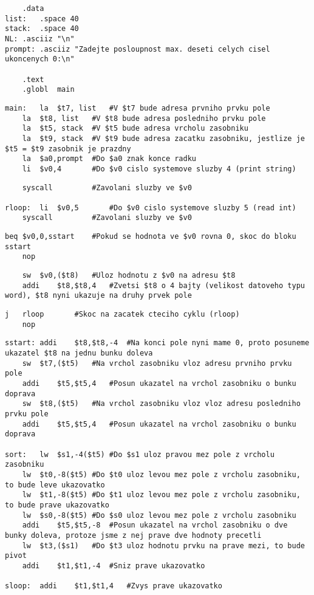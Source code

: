 \documentclass[11pt, titlepage]{article}
\begin{document}
\begin{lstlisting}
	.data
list:	.space 40
stack:	.space 40
NL:	.asciiz "\n"
prompt:	.asciiz "Zadejte posloupnost max. deseti celych cisel ukoncenych 0:\n"

	.text
	.globl	main
\end{lstlisting}
\begin{lstlisting}[backgroundcolor=\color{Green}] 
main:	la	$t7, list	#V $t7 bude adresa prvniho prvku pole
	la	$t8, list	#V $t8 bude adresa posledniho prvku pole 
	la	$t5, stack	#V $t5 bude adresa vrcholu zasobniku
	la	$t9, stack	#V $t9 bude adresa zacatku zasobniku, jestlize je $t5 = $t9 zasobnik je prazdny
	la	$a0,prompt	#Do $a0 znak konce radku
	li	$v0,4		#Do $v0 cislo systemove sluzby 4 (print string)
\end{lstlisting}
\begin{lstlisting}
	syscall			#Zavolani sluzby ve $v0

rloop:	li	$v0,5		#Do $v0 cislo systemove sluzby 5 (read int)
	syscall			#Zavolani sluzby ve $v0
\end{lstlisting}
\begin{lstlisting}[backgroundcolor=\color{Red}]   
	beq	$v0,0,sstart	#Pokud se hodnota ve $v0 rovna 0, skoc do bloku sstart
	nop
\end{lstlisting}
\begin{lstlisting}
	sw	$v0,($t8)	#Uloz hodnotu z $v0 na adresu $t8
	addi	$t8,$t8,4	#Zvetsi $t8 o 4 bajty (velikost datoveho typu word), $t8 nyni ukazuje na druhy prvek pole
\end{lstlisting}
\begin{lstlisting}[backgroundcolor=\color{Red}]   
	j	rloop		#Skoc na zacatek cteciho cyklu (rloop)
	nop
\end{lstlisting}
\begin{lstlisting}
sstart:	addi	$t8,$t8,-4	#Na konci pole nyni mame 0, proto posuneme ukazatel $t8 na jednu bunku doleva
	sw	$t7,($t5)	#Na vrchol zasobniku vloz adresu prvniho prvku pole
	addi	$t5,$t5,4	#Posun ukazatel na vrchol zasobniku o bunku doprava
	sw	$t8,($t5)	#Na vrchol zasobniku vloz vloz adresu posledniho prvku pole
	addi	$t5,$t5,4	#Posun ukazatel na vrchol zasobniku o bunku doprava

sort:	lw	$s1,-4($t5)	#Do $s1 uloz pravou mez pole z vrcholu zasobniku
	lw	$t0,-8($t5)	#Do $t0 uloz levou mez pole z vrcholu zasobniku, to bude leve ukazovatko
	lw	$t1,-8($t5)	#Do $t1 uloz levou mez pole z vrcholu zasobniku, to bude prave ukazovatko
	lw	$s0,-8($t5)	#Do $s0 uloz levou mez pole z vrcholu zasobniku
	addi	$t5,$t5,-8	#Posun ukazatel na vrchol zasobniku o dve bunky doleva, protoze jsme z nej prave dve hodnoty precetli
	lw	$t3,($s1)	#Do $t3 uloz hodnotu prvku na prave mezi, to bude pivot
	addi	$t1,$t1,-4	#Sniz prave ukazovatko

sloop:	addi	$t1,$t1,4	#Zvys prave ukazovatko
\end{lstlisting}
\end{document}

